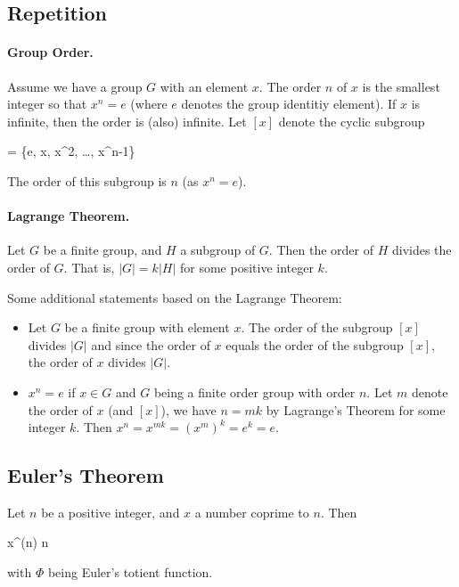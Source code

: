 
\subsection{Repetition}

\paragraph{Group Order.} Assume we have a group $G$ with an element $x$. The order $n$ of $x$ is the smallest integer so that $x^n = e$ (where $e$ denotes the group identitiy element). If $x$ is infinite, then the order is (also) infinite. Let $[x]$ denote the cyclic subgroup

\bee
[x] = \{e, x, x^2, \ldots, x^{n-1}\}
\eee

The order of this subgroup is $n$ (as $x^n = e$).

\paragraph{Lagrange Theorem.} Let $G$ be a finite group, and $H$ a subgroup of $G$. Then the order of $H$ divides the order of $G$. That is, $|G| = k |H|$ for some positive integer $k$.


Some additional statements based on the Lagrange Theorem:

\begin{itemize}

  \item Let $G$ be a finite group with element $x$. The order of the subgroup $[x]$ divides $|G|$ and since the order of $x$ equals the order of the subgroup $[x]$, the order of $x$ divides $|G|$.

  \item $x^n = e$ if $x \in G$ and $G$ being a finite order group with order $n$. Let $m$ denote the order of $x$ (and $[x]$), we have $n = mk$ by Lagrange's Theorem for some integer $k$. Then $x^n = x^{mk} = (x^m)^k = e^k = e$.

\end{itemize}


\subsection{Euler's Theorem}

\begin{theorem}

Let $n$ be a positive integer, and $x$ a number coprime to $n$. Then

\bee
x^{\Phi(n)}  \bmod n
\eee

with $\Phi$ being Euler's totient function.
  
\end{theorem}

